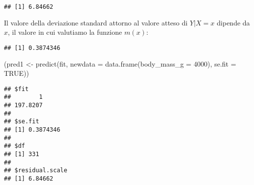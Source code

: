 \documentclass[
]{article}
\newenvironment{Shaded}{\begin{snugshade}}{\end{snugshade}}
\newcommand{\AttributeTok}[1]{\textcolor[rgb]{0.77,0.63,0.00}{#1}}
\newcommand{\CommentTok}[1]{\textcolor[rgb]{0.56,0.35,0.01}{\textit{#1}}}
\newcommand{\ConstantTok}[1]{\textcolor[rgb]{0.00,0.00,0.00}{#1}}
\newcommand{\DecValTok}[1]{\textcolor[rgb]{0.00,0.00,0.81}{#1}}
\newcommand{\FunctionTok}[1]{\textcolor[rgb]{0.00,0.00,0.00}{#1}}
\newcommand{\NormalTok}[1]{#1}
\newcommand{\OtherTok}[1]{\textcolor[rgb]{0.56,0.35,0.01}{#1}}
\newcommand{\SpecialCharTok}[1]{\textcolor[rgb]{0.00,0.00,0.00}{#1}}
\begin{document}
\begin{verbatim}
## [1] 6.84662
\end{verbatim}

Il valore della deviazione standard attorno al valore atteso di
\(Y|X=x\) dipende da \(x\), il valore in cui valutiamo la funzione
\(m(x)\):

\begin{Shaded}
\end{Shaded}

\begin{verbatim}
## [1] 0.3874346
\end{verbatim}

\begin{Shaded}
\begin{Highlighting}[]
\NormalTok{(pred1 }\OtherTok{\textless{}{-}} \FunctionTok{predict}\NormalTok{(fit, }\AttributeTok{newdata =} \FunctionTok{data.frame}\NormalTok{(}\AttributeTok{body\_mass\_g =} \DecValTok{4000}\NormalTok{), }\AttributeTok{se.fit =} \ConstantTok{TRUE}\NormalTok{))}
\end{Highlighting}
\end{Shaded}

\begin{verbatim}
## $fit
##        1 
## 197.8207 
## 
## $se.fit
## [1] 0.3874346
## 
## $df
## [1] 331
## 
## $residual.scale
## [1] 6.84662
\end{verbatim}

\begin{Shaded}
\end{Shaded}
\end{document}
